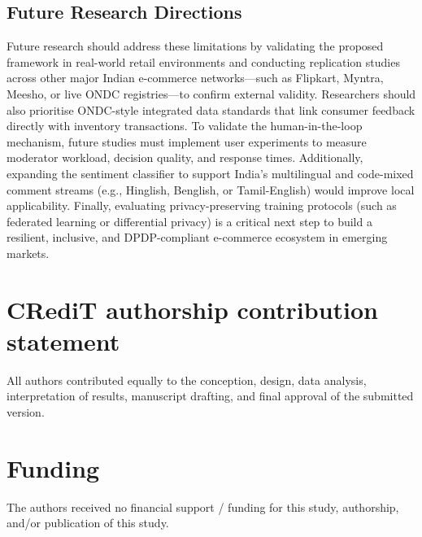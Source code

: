 \documentclass[authoryear,review,3p,times,12pt]{elsarticle}
\begin{document}
\subsection{Future Research Directions}
\label{sec:future_research}
Future research should address these limitations by validating the proposed framework in real-world retail environments and conducting replication studies across other major Indian e-commerce networks—such as Flipkart, Myntra, Meesho, or live ONDC registries—to confirm external validity. Researchers should also prioritise ONDC-style integrated data standards that link consumer feedback directly with inventory transactions. To validate the human-in-the-loop mechanism, future studies must implement user experiments to measure moderator workload, decision quality, and response times. Additionally, expanding the sentiment classifier to support India's multilingual and code-mixed comment streams (e.g., Hinglish, Benglish, or Tamil-English) would improve local applicability. Finally, evaluating privacy-preserving training protocols (such as federated learning or differential privacy) is a critical next step to build a resilient, inclusive, and DPDP-compliant e-commerce ecosystem in emerging markets.


\section*{CRediT authorship contribution statement}
All authors contributed equally to the conception, design, data analysis, interpretation of results, manuscript drafting, and final approval of the submitted version.




\section*{Funding} The authors received no financial support / funding for this study, authorship, and/or publication of this study.
\end{document}
